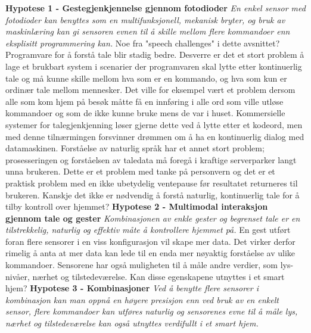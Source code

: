 \textbf{Hypotese 1 - Gestegjenkjennelse gjennom fotodioder}\newline
\emph{En enkel sensor med fotodioder kan benyttes som en multifunksjonell, mekanisk bryter, og bruk av maskinlæring kan gi sensoren evnen til å skille mellom flere kommandoer enn eksplisitt programmering kan.}\newline
{\color{red}Noe fra "speech challenges" i dette avsnittet?}Programvare for å forstå tale blir stadig bedre. Desverre er det et stort problem å lage et brukbart system i scenarier der programvaren skal lytte etter kontinuerlig tale og må kunne skille mellom hva som er en kommando, og hva som kun er ordinær tale mellom mennesker. Det ville for eksempel vært et problem dersom alle som kom hjem på besøk måtte få en innføring i alle ord som ville utløse kommandoer og som de ikke kunne bruke mens de var i huset. Kommersielle systemer for talegjenkjenning løser gjerne dette ved å lytte etter et kodeord, men med denne tilnærmingen forsvinner drømmen om å ha en kontinuerlig dialog med datamaskinen. Forståelse av naturlig språk har et annet stort problem; prosesseringen og forståelsen av taledata må foregå i kraftige serverparker langt unna brukeren. Dette er et problem med tanke på personvern og det er et praktisk problem med en ikke ubetydelig ventepause før resultatet returneres til brukeren. Kanskje det ikke er nødvendig å forstå naturlig, kontinuerlig tale for å tilby kontroll over hjemmet? \newline\newline
\textbf{Hypotese 2 - Multimodal interaksjon gjennom tale og gester}\newline
\emph{Kombinasjonen av enkle gester og begrenset tale er en tilstrekkelig, naturlig og effektiv måte å kontrollere hjemmet på.}\newline
En gest utført foran flere sensorer i en viss konfigurasjon vil skape mer data. Det virker derfor rimelig å anta at mer data kan lede til en enda mer nøyaktig forståelse av ulike kommandoer. Sensorene har også muligheten til å måle andre verdier, som lys-nivåer, nærhet og tilstedeværelse. Kan disse egenskapene utnyttes i et smart hjem?\newline\newline
\textbf{Hypotese 3 - Kombinasjoner}\newline
\emph{Ved å benytte flere sensorer i kombinasjon kan man oppnå en høyere presisjon enn ved bruk av en enkelt sensor, flere kommandoer kan utføres naturlig og sensorenes evne til å måle lys, nærhet og tilstedeværelse kan også utnyttes verdifullt i et smart hjem.}\newline
